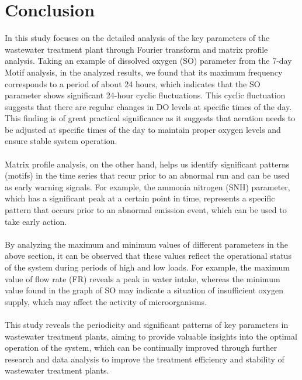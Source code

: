 \documentclass[]{iat}
\begin{document}
\chapter{Conclusion}
In this study focuses on the detailed analysis of the key parameters of the wastewater treatment plant through Fourier transform and matrix profile analysis. Taking an example of dissolved oxygen (SO) parameter from the 7-day Motif analysis, in the analyzed results, we found that its maximum frequency corresponds to a period of about 24 hours, which indicates that the SO parameter shows significant 24-hour cyclic fluctuations. This cyclic fluctuation suggests that there are regular changes in DO levels at specific times of the day. This finding is of great practical significance as it suggests that aeration needs to be adjusted at specific times of the day to maintain proper oxygen levels and ensure stable system operation.\\
\\
Matrix profile analysis, on the other hand, helps us identify significant patterns (motifs) in the time series that recur prior to an abnormal run and can be used as early warning signals. For example, the ammonia nitrogen (SNH) parameter, which has a significant peak at a certain point in time, represents a specific pattern that occurs prior to an abnormal emission event, which can be used to take early action.\\
\\
By analyzing the maximum and minimum values of different parameters in the above section, it can be observed that these values reflect the operational status of the system during periods of high and low loads. For example, the maximum value of flow rate (FR) reveals a peak in water intake, whereas the minimum value found in the graph of SO may indicate a situation of insufficient oxygen supply, which may affect the activity of microorganisms.\\
\\
This study reveals the periodicity and significant patterns of key parameters in wastewater treatment plants, aiming to provide valuable insights into the optimal operation of the system, which can be continually improved through further research and data analysis to improve the treatment efficiency and stability of wastewater treatment plants.
\end{document}
